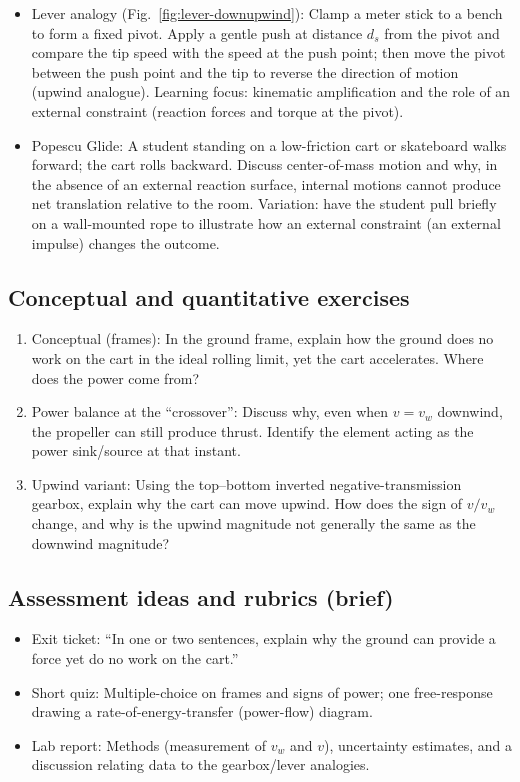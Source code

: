 \documentclass[reprint,aps,pra,longbibliography]{revtex4-2}
\begin{document}
\begin{itemize}
\item Lever analogy (Fig.~\ref{fig:lever-downupwind}): Clamp a meter stick to a bench to form a fixed pivot. Apply a gentle push at distance $d_s$ from the pivot and compare the tip speed with the speed at the push point; then move the pivot between the push point and the tip to reverse the direction of motion (upwind analogue). Learning focus: kinematic amplification and the role of an external constraint (reaction forces and torque at the pivot).
\item Popescu Glide: A student standing on a low-friction cart or skateboard walks forward; the cart rolls backward. Discuss center-of-mass motion and why, in the absence of an external reaction surface, internal motions cannot produce net translation relative to the room. Variation: have the student pull briefly on a wall-mounted rope to illustrate how an external constraint (an external impulse) changes the outcome.
\end{itemize}

\subsection{Conceptual and quantitative exercises}

\begin{enumerate}
\item Conceptual (frames): In the ground frame, explain how the ground does no work on the cart in the ideal rolling limit, yet the cart accelerates. Where does the power come from?

\item Power balance at the ``crossover'': Discuss why, even when $v=v_w$ downwind, the propeller can still produce thrust. Identify the element acting as the power sink/source at that instant.

\item Upwind variant: Using the top--bottom inverted negative-transmission gearbox, explain why the cart can move upwind. How does the sign of $v/v_w$ change, and why is the upwind magnitude not generally the same as the downwind magnitude?
\end{enumerate}

\subsection{Assessment ideas and rubrics (brief)}

\begin{itemize}
\item Exit ticket: ``In one or two sentences, explain why the ground can provide a force yet do no work on the cart.''
\item Short quiz: Multiple-choice on frames and signs of power; one free-response drawing a rate-of-energy-transfer (power-flow) diagram.
\item Lab report: Methods (measurement of $v_w$ and $v$), uncertainty estimates, and a discussion relating data to the gearbox/lever analogies.
\end{itemize}
\end{document}
